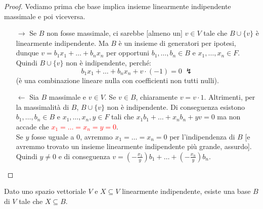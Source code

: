 \documentclass[11pt]{scrartcl}
\begin{document}
\begin{proof}
	Vediamo prima che base implica insieme linearmente indipendente massimale e poi viceversa.
	\begin{itemize}
		\item[$\boxed{\longrightarrow}$] Se $B$ non fosse massimale, ci sarebbe [almeno un] $v \in V$ tale che $B \cup \{v\}$ è linearmente indipendente. Ma $B$ è un insieme di generatori per ipotesi, dunque 
		$v = b_1x_1 + \ldots + b_nx_n$ per opportuni $b_1,\ldots,b_n \in B$ e $x_1,\ldots,x_n \in F$. Quindi $B \cup \{v\}$ non è indipendente, perché:
		\[ b_1x_1 + \ldots + b_nx_n + v \cdot (-1) = 0 \; \lightning
			\]
		(è una combinazione lineare nulla con coefficienti non tutti nulli).
		\item[$\boxed{\longleftarrow}$] Sia $B$ massimale e $v \in V$. Se $v \in B$, chiaramente $v = v \cdot 1$. Altrimenti, per la massimalità di $B$, $B \cup \{v\}$ non è indipendente.
		Di conseguenza esistono $b_1,\ldots,b_n \in B$ e $x_1,\ldots,x_n,y \in F$ tali che $x_1b_1 + \ldots + x_nb_n + yv = 0$ ma non accade che \textcolor{red}{$x_1 = \ldots = x_n = y = 0$}.\\
		Se $y$ fosse uguale a 0, avremmo $x_1 = \ldots = x_n = 0$ per l'indipendenza di $B$ [e avremmo trovato un insieme linearmente indipendente più grande, assurdo]. Quindi $y \ne 0$ e di conseguenza $v = \left(-\frac{x_1}{y}\right)b_1 + \ldots + \left(-\frac{x_n}{y}\right)b_n$.
	\end{itemize}
\end{proof}

\begin{proposition}
	Dato uno spazio vettoriale $V$ e $X \subseteq V$ linearmente indipendente, esiste una base $B$ di $V$ tale che $X \subseteq B$.
\end{proposition}
\end{document}
